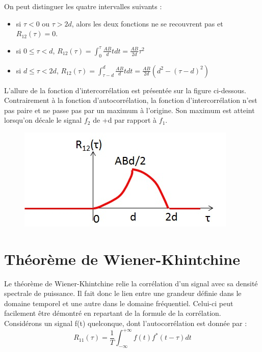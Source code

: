 	On peut distinguer les quatre intervalles suivants :
	\begin{itemize}
		\item si $\tau < 0$ ou $\tau > 2d$, alors les deux fonctions ne se recouvrent pas et $R_{12}(\tau)=0$.
		\item si $0 \leq \tau < d$, $R_{12}(\tau)=\int_{0}^{\tau}\frac{AB}{d}tdt=\frac{AB}{2d}\tau ^{2}$ 
		\item si $d \leq \tau < 2d$, $R_{12}(\tau)=\int_{\tau-d}^{d}\frac{AB}{d}tdt=\frac{AB}{2d}(d^{2}-(\tau-d)^{2})$
	\end{itemize}
	
	L'allure de la fonction d'intercorrélation est présentée sur la figure ci-dessous. Contrairement à la fonction d'autocorrélation, la fonction d'intercorrélation n'est pas paire et ne passe pas par un maximum à l'origine. Son maximum est atteint lorsqu'on décale le signal $f_{2}$ de +d par rapport à $f_{1}$.


	\begin{figure}[h!]
		\centering
		\includegraphics[scale=0.6]{images/Ex_intercorrelation2.jpg}
	\end{figure}
	
	
	\vspace{1\baselineskip}
	
	
	\section{Théorème de Wiener-Khintchine}
	
	Le théorème de Wiener-Khintchine relie la corrélation d'un signal avec sa densité spectrale de puissance. Il fait donc le lien entre une grandeur définie dans le domaine temporel et une autre dans le domaine fréquentiel. Celui-ci peut facilement être démontré en repartant de la formule de la corrélation. Considérons un signal f(t) quelconque, dont l'autocorrélation est donnée par :
	\begin{equation*}
	R_{11}(\tau)=\frac{1}{T}\int_{-\infty}^{+\infty}f(t)f^{*}(t-\tau)dt
	\end{equation*}
	
